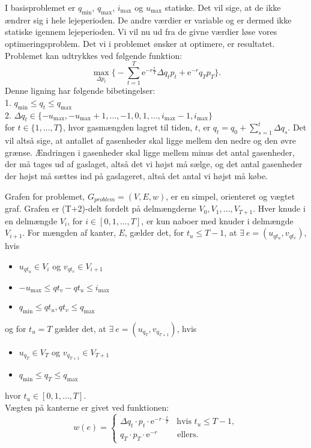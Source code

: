 I basisproblemet er $q_{\min}$, $q_{\max}$, $i_{\max}$ og $u_{\max}$ statiske. Det vil sige, at de ikke ændrer sig i hele lejeperioden. De andre værdier er variable og er dermed ikke statiske igennem lejeperioden. Vi vil nu ud fra de givne værdier løse vores optimeringsproblem. Det vi i problemet ønsker at optimere, er resultatet. Problemet kan udtrykkes ved følgende funktion:
\begin{equation}
\max_{\Delta p_{t}} \Bigg\{ -\sum_{t=1}^{T} \mathrm{e}^{-r\frac{t}{T}} \Delta q_{t} p_{t}+ \mathrm{e}^{-r}q_{T}p_{T} \Bigg\}.
\end{equation}
Denne ligning har følgende bibetingelser:\\
1. $q_{\min} \leq q_{t} \leq q_{\max}$\\
2. $\Delta q_{t} \in \{-u_{\max},-u_{\max}+1,\dotsc,-1,0,1,\dotsc,i_{\max}-1,i_{\max} \}$ \\
for $t \in \{1,\dotsc,T\}$, hvor gasmængden lagret til tiden, $t$, er $q_{t}=q_{0}+\sum_{s=1}^{t} \Delta q_{s}$.
Det vil altså sige, at antallet af gasenheder skal ligge mellem den nedre og den øvre grænse. Ændringen i gasenheder skal ligge mellem minus det antal gasenheder, der må tages ud af gaslaget, altså det vi højst må sælge, og det antal gasenheder der højst må sættes ind på gaslageret, altså det antal vi højst må købe.


\begin{defn}
Grafen for problemet, $G_{problem}=(V,E,w)$, er en simpel, orienteret og vægtet graf. Grafen er (T+2)-delt fordelt på delmængderne $V_0,V_1, \dotsc, V_{T+1}$.
Hver knude i en delmængde $V_i$, for $i \in [0,1, \dotsc, T]$, er kun naboer med knuder i delmængde $V_{i+1}$. 
For mængden af kanter, $E$, gælder det, for $t_u \leq T-1$, at $\exists \ e=(u_{qt_u}, v_{qt_v})$, hvis
	\begin{itemize}
	\item $u_{qt_u} \in V_i$ og $v_{qt_v} \in V_{i+1}$
	\item $-u_{\max} \leq qt_v-qt_u \leq i_{\max}$
	\item $q_{\min} \leq qt_u,qt_v \leq q_{\max}$
	\end{itemize}
og for $t_u = T$ gælder det, at $\exists \ e = (u_{q_T}, v_{q_{T+1}})$, hvis
	\begin{itemize}
	\item $u_{q_{T}} \in V_T$ og $v_{q_{T+1}} \in V_{T+1}$
	\item $q_{\min} \leq q_{T} \leq q_{\max}$
	\end{itemize}
hvor $t_u \in [0,1, \dotsc, T]$. \\
Vægten på kanterne er givet ved funktionen:
\begin{equation}
w(e)=
	\begin{cases}
	\Delta q_t \cdot p_t \cdot \textrm{e}^{-r \cdot \frac{t}{T}} \ \ \ \ \mbox{hvis } t_u \leq T-1, \\
	q_T \cdot p_T \cdot \textrm{e}^{-r} \qquad \mbox{ ellers.}
	\end{cases}
\end{equation}



\end{defn}
